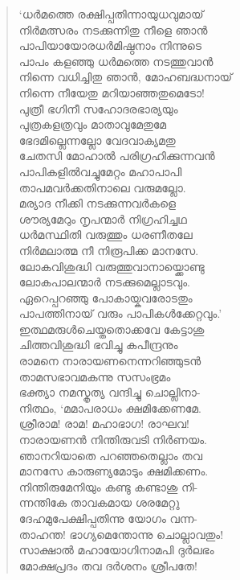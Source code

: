 \begin{verse}
‘ധര്‍മത്തെ രക്ഷിപ്പതിന്നായുധവുമായ്\\
നിര്‍മത്സരം നടക്കുന്നിതു നീളെ ഞാന്‍\\
പാപിയായോരധര്‍മിഷ്ഠനാം നിന്നുടെ\\
പാപം കളഞ്ഞു ധര്‍മത്തെ നടത്തുവാന്‍\\
നിന്നെ വധിച്ചിതു ഞാന്‍, മോഹബദ്ധനായ്\\
നിന്നെ നീയേതു മറിയാഞ്ഞതുമെടോ!\\
പുത്രീ ഭഗിനീ സഹോദരഭാര്യയും\\
പുത്രകളത്രവും മാതാവുമേതുമേ\\
ഭേദമില്ലെന്നല്ലോ വേദവാക്യമതു\\
ചേതസി മോഹാല്‍ പരിഗ്രഹിക്കുന്നവന്‍\\
പാപികളില്‍വച്ചുമേറ്റം മഹാപാപി\\
താപമവര്‍ക്കതിനാലെ വരുമല്ലോ.\\
മര്യാദ നീക്കി നടക്കുന്നവര്‍കളെ\\
ശൗര്യമേറും നൃപന്മാര്‍ നിഗ്രഹിച്ചഥ\\
ധര്‍മസ്ഥിതി വരുത്തും ധരണീതലേ\\
നിര്‍മലാത്മ നീ നിരൂപിക്ക മാനസേ.\\
ലോകവിശുദ്ധി വരുത്തുവാനായ്ക്കൊണ്ടു\\
ലോകപാലന്മാര്‍ നടക്കുമെല്ലാടവും.\\
ഏറെപ്പറഞ്ഞു പോകായ്കവരോടതും\\
പാപത്തിനായ് വരും പാപികള്‍ക്കേറ്റവും.’\\
ഇത്ഥമരുള്‍ചെയ്തതൊക്കവേ കേട്ടാശു\\
ചിത്തവിശുദ്ധി ഭവിച്ചു കപീന്ദ്രനും\\
രാമനെ നാരായണനെന്നറിഞ്ഞുടന്‍\\
താമസഭാവമകന്നു സസംഭ്രമം\\
ഭക്ത്യാ നമസ്കൃത്യ വന്ദിച്ചു ചൊല്ലിനാ-\\
നിത്ഥം, ‘മമാപരാധം ക്ഷമിക്കേണമേ.\\
ശ്രീരാമ! രാമ! മഹാഭാഗ! രാഘവ!\\
നാരായണന്‍ നിന്തിരുവടി നിര്‍ണയം.\\
ഞാനറിയാതെ പറഞ്ഞതെല്ലാം തവ\\
മാനസേ കാരുണ്യമോടും ക്ഷമിക്കണം.\\
നിന്തിരുമേനിയും കണ്ടു കണ്ടാശു നി-\\
ന്നന്തികേ താവകമായ ശരമേറ്റു\\
ദേഹമുപേക്ഷിപ്പതിന്നു യോഗം വന്ന-\\
താഹന്ത! ഭാഗ്യമെന്തോന്നു ചൊല്ലാവതും!\\
സാക്ഷാല്‍ മഹായോഗിനാമപി ദുര്‍ലഭം\\
മോക്ഷപ്രദം തവ ദര്‍ശനം ശ്രീപതേ!\\

\end{verse}
